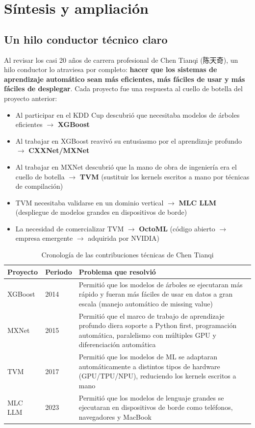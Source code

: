 \section{Síntesis y ampliación}

\subsection{Un hilo conductor técnico claro}

Al revisar los casi 20 años de carrera profesional de Chen Tianqi (陈天奇), un hilo conductor lo atraviesa por completo: \textbf{hacer que los sistemas de aprendizaje automático sean más eficientes, más fáciles de usar y más fáciles de desplegar}. Cada proyecto fue una respuesta al cuello de botella del proyecto anterior:

\begin{itemize}
    \item Al participar en el KDD Cup descubrió que necesitaba modelos de árboles eficientes $\rightarrow$ \textbf{XGBoost}
    \item Al trabajar en XGBoost reavivó su entusiasmo por el aprendizaje profundo $\rightarrow$ \textbf{CXXNet/MXNet}
    \item Al trabajar en MXNet descubrió que la mano de obra de ingeniería era el cuello de botella $\rightarrow$ \textbf{TVM} (sustituir los kernels escritos a mano por técnicas de compilación)
    \item TVM necesitaba validarse en un dominio vertical $\rightarrow$ \textbf{MLC LLM} (despliegue de modelos grandes en dispositivos de borde)
    \item La necesidad de comercializar TVM $\rightarrow$ \textbf{OctoML} (código abierto $\rightarrow$ empresa emergente $\rightarrow$ adquirida por NVIDIA)
\end{itemize}

\begin{table}[H]
\centering
\begin{tabular}{p{2.2cm}p{1.8cm}p{9cm}}
\toprule
\textbf{Proyecto} & \textbf{Periodo} & \textbf{Problema que resolvió} \\
\midrule
XGBoost & 2014 & Permitió que los modelos de árboles se ejecutaran más rápido y fueran más fáciles de usar en datos a gran escala (manejo automático de missing value) \\
MXNet & 2015 & Permitió que el marco de trabajo de aprendizaje profundo diera soporte a Python first, programación automática, paralelismo con múltiples GPU y diferenciación automática \\
TVM & 2017 & Permitió que los modelos de ML se adaptaran automáticamente a distintos tipos de hardware (GPU/TPU/NPU), reduciendo los kernels escritos a mano \\
MLC LLM & 2023 & Permitió que los modelos de lenguaje grandes se ejecutaran en dispositivos de borde como teléfonos, navegadores y MacBook \\
\bottomrule
\end{tabular}
\caption{Cronología de las contribuciones técnicas de Chen Tianqi}
\end{table}

